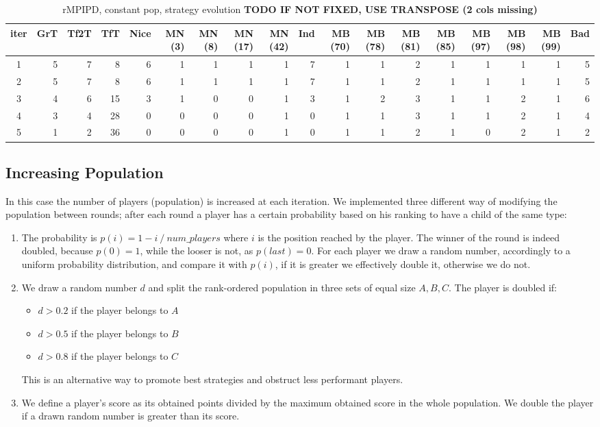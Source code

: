 \documentclass[journal,a4paper,10pt,twoside]{IEEEtran} %
\begin{document}
\begin{table}[ht]
    \caption{rMPIPD, constant pop, strategy evolution \textbf{TODO IF NOT FIXED, USE TRANSPOSE (2 cols missing)}}
    \label{tab:ripdmp-const}
    \centering
    \begin{tabular}{c|rrrrrrrrrrrrrrrrr} \toprule
        iter & GrT & Tf2T & TfT & Nice & MN (3) & MN (8) & MN (17) & MN (42) & Ind & MB (70) & MB (78) & MB (81) & MB (85) & MB (97) & MB (98) & MB (99) & Bad \\ \midrule
        1 &  5 &  7 &   8 &  6 &  1 &  1 &  1 &  1 &  7 &  1 &  1 &  2 &  1 &  1 &  1 &  1 &  5 \\
        2 &  5 &  7 &   8 &  6 &  1 &  1 &  1 &  1 &  7 &  1 &  1 &  2 &  1 &  1 &  1 &  1 &  5 \\
        3 &  4 &  6 &  15 &  3 &  1 &  0 &  0 &  1 &  3 &  1 &  2 &  3 &  1 &  1 &  2 &  1 &  6 \\
        4 &  3 &  4 &  28 &  0 &  0 &  0 &  0 &  1 &  0 &  1 &  1 &  3 &  1 &  1 &  2 &  1 &  4 \\
        5 &  1 &  2 &  36 &  0 &  0 &  0 &  0 &  1 &  0 &  1 &  1 &  2 &  1 &  0 &  2 &  1 &  2 \\ \bottomrule
    \end{tabular}
\end{table}

\subsection{Increasing Population}
In this case the number of players (population) is increased at each iteration. We implemented three different way of modifying the population between rounds; after each round a player has a certain probability based on his ranking to have a child of the same type:
\begin{enumerate}
    \item The probability is $p(i)=1- i\ /\ num\_players$ where $i$ is the position reached by the player. The winner of the round is indeed doubled, because $p(0)=1$, while the looser is not, as $p(last)=0$.
    For each player we draw a random number, accordingly to a uniform probability distribution, and compare it with $p(i)$, if it is greater we effectively double it, otherwise we do not.
    \item We draw a random number $d$ and split the rank-ordered population in three sets of equal size $A,B,C$. The player is doubled if:
    \begin{itemize}
        \item $d>0.2$ if the player belongs to $A$
        \item $d>0.5$ if the player belongs to $B$
        \item $d>0.8$ if the player belongs to $C$
    \end{itemize}
    This is an alternative way to promote best strategies and obstruct less performant players.
    \item We define a player's score as its obtained points divided by the maximum obtained score in the whole population. We double the player if a drawn random number is greater than its score.
\end{enumerate}
\end{document}
